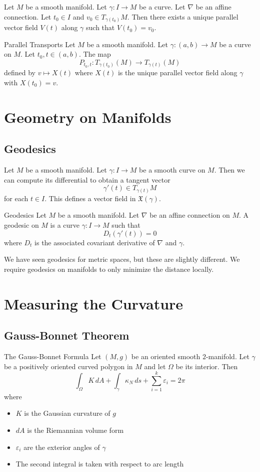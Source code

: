 \documentclass[a4paper]{article}
\begin{document}
\begin{thm}{}{} Let $M$ be a smooth manifold. Let $\gamma:I\to M$ be a curve. Let $\nabla$ be an affine connection. Let $t_0\in I$ and $v_0\in T_{\gamma(t_0)}M$. Then there exists a unique parallel vector field $V(t)$ along $\gamma$ such that $V(t_0)=v_0$. 
\end{thm}

\begin{defn}{Parallel Transports}{} Let $M$ be a smooth manifold. Let $\gamma:(a,b)\to M$ be a curve on $M$. Let $t_0,t\in(a,b)$. The map $$P_{t_0,t}:T_{\gamma(t_0)}(M)\to T_{\gamma(t)}(M)$$ defined by $v\mapsto X(t)$ where $X(t)$ is the unique parallel vector field along $\gamma$ with $X(t_0)=v$. 
\end{defn}


\pagebreak
\section{Geometry on Manifolds}
\subsection{Geodesics}
Let $M$ be a smooth manifold. Let $\gamma:I\to M$ be a smooth curve on $M$. Then we can compute its differential to obtain a tangent vector $$\gamma'(t)\in T_{\gamma(t)}M$$ for each $t\in I$. This defines a vector field in $\mathfrak{X}(\gamma)$. 

\begin{defn}{Geodesics}{} Let $M$ be a smooth manifold. Let $\nabla$ be an affine connection on $M$. A geodesic on $M$ is a curve $\gamma:I\to M$ such that $$D_t(\gamma'(t))=0$$ where $D_t$ is the associated covariant derivative of $\nabla$ and $\gamma$. 
\end{defn}

We have seen geodesics for metric spaces, but these are slightly different. We require geodesics on manifolds to only minimize the distance locally. 

\pagebreak
\section{Measuring the Curvature}
\subsection{Gauss-Bonnet Theorem}
\begin{thm}{The Gauss-Bonnet Formula}{} Let $(M,g)$ be an oriented smooth $2$-manifold. Let $\gamma$ be a positively oriented curved polygon in $M$ and let $\Omega$ be its interior. Then $$\int_\Omega K\,dA+\int_\gamma\kappa_N\,ds+\sum_{i=1}^k\varepsilon_i=2\pi$$ where 
\begin{itemize}
\item $K$ is the Gaussian curvature of $g$
\item $dA$ is the Riemannian volume form
\item $\varepsilon_i$ are the exterior angles of $\gamma$
\item The second integral is taken with respect to arc length
\end{itemize}	
\end{thm}
\end{document}
